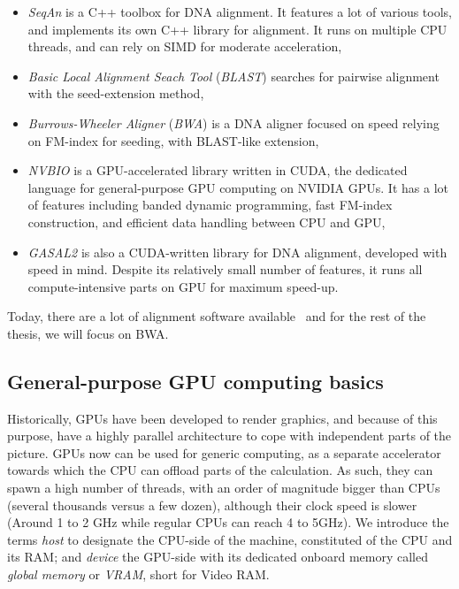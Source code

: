 \begin{itemize}
    \item \emph{SeqAn} is a C++ toolbox for DNA alignment. It features a lot of various tools, and implements its own C++ library for alignment. It runs on multiple CPU threads, and can rely on SIMD for moderate acceleration,
    \item \emph{Basic Local Alignment Seach Tool} (\emph{BLAST}) searches for pairwise alignment with the seed-extension method,
    \item \emph{Burrows-Wheeler Aligner} (\emph{BWA}) is a DNA aligner focused on speed relying on FM-index for seeding, with BLAST-like extension,
    \item \emph{NVBIO} is a GPU-accelerated library written in CUDA, the dedicated language for general-purpose GPU computing on NVIDIA GPUs. It has a lot of features including banded dynamic programming, fast FM-index construction, and efficient data handling between CPU and GPU,
    \item \emph{GASAL2} is also a CUDA-written library for DNA alignment, developed with speed in mind. Despite its relatively small number of features, it runs all compute-intensive parts on GPU for maximum speed-up.
\end{itemize}

Today, there are a lot of alignment software available~\cite{wiki:ListAlignmentSoft} and for the rest of the thesis, we will focus on BWA.

\subsection{General-purpose GPU computing basics}

Historically, GPUs have been developed to render graphics, and because of this purpose, have a highly parallel architecture to cope with independent parts of the picture. GPUs now can be used for generic computing, as a separate accelerator towards which the CPU can offload parts of the calculation. As such, they can spawn a high number of threads, with an order of magnitude bigger than CPUs (several thousands versus a few dozen), although their clock speed is slower (Around 1 to 2 GHz while regular CPUs can reach 4 to 5GHz). We introduce the terms \emph{host} to designate the CPU-side of the machine, constituted of the CPU and its RAM; and \emph{device} the GPU-side with its dedicated onboard memory called \emph{global memory} or \emph{VRAM}, short for Video RAM.

